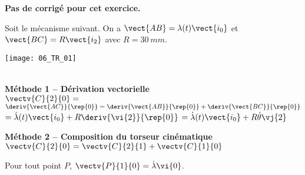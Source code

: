 \normaltrue
\correctiontrue


\setcounter{question}{0}
\ifcorrection
\else
\textbf{Pas de corrigé pour cet exercice.}
\fi

\ifprof
\else
Soit le mécanisme suivant. On a $\vect{AB}=\lambda(t)\vect{i_0}$ et $\vect{BC}=R\vect{i_2}$ avec $R=\SI{30}{mm}$. 
\begin{center}
\texttt{[image: 06\_TR\_01]}
\end{center}
\fi

\ifprof
\else
\ifcolle
\else
{}
\fi
{}
\fi

\ifprof ~\\

\textbf{Méthode 1 -- Dérivation vectorielle} ~\\

$\vectv{C}{2}{0} =$
$\deriv{\vect{AC}}{\rep{0}}= \deriv{\vect{AB}}{\rep{0}}+\deriv{\vect{BC}}{\rep{0}}$
$= \dot{\lambda}(t) \vect{i_0} + R \deriv{\vi{2}}{\rep{0}}$
$= \dot{\lambda}(t) \vect{i_0} + R \dot{\theta} \vj{2}$

\textbf{Méthode 2 -- Composition du torseur cinématique} ~\\
$\vectv{C}{2}{0} =\vectv{C}{2}{1} +\vectv{C}{1}{0} $

Pour tout point $P$, $\vectv{P}{1}{0}=\dot{\lambda}\vi{0}$.

